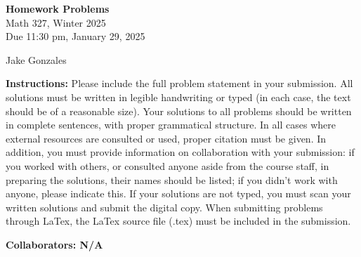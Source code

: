 \documentclass [10pt]{article}
\newcommand{\jg}[1]{{\color{blue} #1}}
\begin{document}
\begin{center}
{\bf Homework Problems}\\
Math 327, Winter 2025\\
Due 11:30 pm, January 29, 2025
\end{center}

\begin{center}
\jg{
    Jake Gonzales}
\end{center}

{\bf Instructions:} Please include the full problem statement in your submission.
All solutions must be written in legible handwriting
or typed (in each case, the text should be of a reasonable size). Your solutions to
all problems should be written in complete sentences, with proper grammatical
structure.
In all cases where external resources are consulted or used, proper citation must
be given. In addition,
you must provide information on collaboration with your submission: if you worked with others,
or consulted anyone aside from the course staff, in preparing the solutions, their
names should be
listed; if you didn't work with anyone, please indicate this.
If your solutions are not typed, you must scan your written solutions and submit
the digital copy. When submitting problems through LaTex, the LaTex source file
(.tex) must be included in the submission.


\jg{
\textbf{Collaborators: N/A }
}
\end{document}
